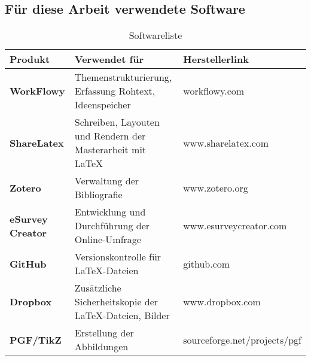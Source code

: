 \documentclass[main.tex]{subfiles}
\begin{document}
\subsection*{Für diese Arbeit verwendete Software}


\begin{table}[H]
\caption{Softwareliste}
\label{used-sw}


\begin{tabular}{ |p{3cm}|p{8cm}|l| }


\hline
\rowcolor[HTML]{C0C0C0} 
\textbf{Produkt} & \textbf{Verwendet für} & \textbf{Herstellerlink}\\ 
\hline


\textbf{WorkFlowy} & Themenstrukturierung, Erfassung Rohtext, Ideenspeicher & workflowy.com \\ \hline
\textbf{ShareLatex} & Schreiben, Layouten und Rendern der Masterarbeit mit \LaTeX & www.sharelatex.com \\ \hline
\textbf{Zotero} & Verwaltung der Bibliografie & www.zotero.org \\ \hline
\textbf{eSurvey Creator} & Entwicklung und Durchführung der Online-Umfrage & www.esurveycreator.com \\ \hline
\textbf{GitHub} & Versionskontrolle für \LaTeX  -Dateien & github.com \\ \hline
\textbf{Dropbox} & Zusätzliche Sicherheitskopie der \LaTeX  -Dateien, Bilder & www.dropbox.com \\ \hline
\textbf{PGF/TikZ} & Erstellung der Abbildungen & sourceforge.net/projects/pgf \\ \hline

\end{tabular}
\end{table}
\end{document}
